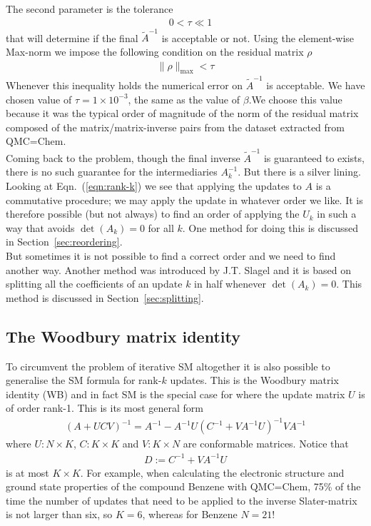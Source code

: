 \documentclass[11pt]{article}
\numberwithin{figure}{section}
\numberwithin{table}{section}
\begin{document}
			The second parameter is the tolerance 
			\begin{align}\label{eqn:tolerance}
				\quad 0 < \tau \ll 1
			\end{align}
			that will determine if the final $\widetilde{A}^{-1}$ is acceptable or not. Using the element-wise Max-norm we impose the following condition on the residual matrix $\rho$
			\begin{align}\label{eqn:acceptance-condition}
				\|\rho\|_\mathrm{max} < \tau
			\end{align}
			Whenever this inequality holds the numerical error on $\widetilde{A}^{-1}$ is acceptable. We have chosen value of $\tau = 1\times 10^{-3}$, the same as the value of $\beta$.We choose this value because it was the typical order of magnitude of the norm of the residual matrix composed of the matrix/matrix-inverse pairs from the dataset extracted from QMC=Chem.\\
			
			Coming back to the problem, though the final inverse $\widetilde{A}^{-1}$ is guaranteed to exists, there is no such guarantee for the intermediaries $A_k^{-1}$. But there is a silver lining. Looking at Eqn.~(\ref{eqn:rank-k}) we see that applying the updates to $A$ is a commutative procedure; we may apply the update in whatever order we like. It is therefore possible (but not always) to find an order of applying the $U_k$ in such a way that avoids $\det(A_k)=0$ for all $k$. One method for doing this is discussed in Section~\ref{sec:reordering}.\\
			
			But sometimes it is not possible to find a correct order and we need to find another way. Another method was introduced by J.T. Slagel and it is based on splitting all the coefficients of an update $k$ in half whenever $\det(A_k)=0$. This method is discussed in Section~\ref{sec:splitting}.\\
			
		\subsection{The Woodbury matrix identity}\label{sec:intro-woodbury}
			To circumvent the problem of iterative SM altogether it is also possible to generalise the SM formula for rank-$k$ updates. This is the Woodbury matrix identity (WB) and in fact SM is the special case for where the update matrix $U$ is of order rank-1. This is its most general form
			\begin{align}
				\left(A+UCV\right)^{-1} = A^{-1} - A^{-1}U(C^{-1}+VA^{-1}U)^{-1}VA^{-1}
			\end{align}
			where $U:N\times K$, $C:K\times K$ and $V:K\times N$ are conformable matrices. Notice that
			\begin{align}\label{eqn:wb-denom}
				D:=C^{-1}+VA^{-1}U
			\end{align}  is at most $K\times K$. For example, when calculating the electronic structure and ground state properties of the compound Benzene with QMC=Chem, 75\% of the time the number of updates that need to be applied to the inverse Slater-matrix is not larger than six, so $K=6$, whereas for Benzene $N=21$!\\
			
\end{document}
